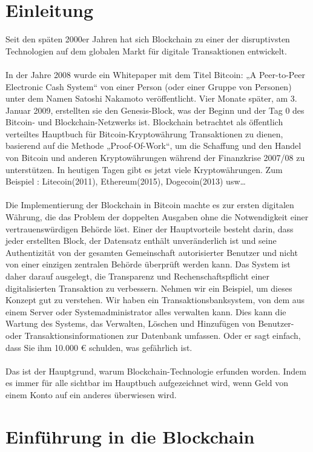 \documentclass[ngerman]{scrreprt}
\begin{document}
\chapter{Einleitung}
Seit den späten 2000er Jahren hat sich Blockchain zu einer der disruptivsten Technologien auf dem globalen Markt für digitale Transaktionen entwickelt.\\ \\
In der Jahre 2008 wurde ein Whitepaper mit dem Titel Bitcoin: „A Peer-to-Peer Electronic Cash System“ von einer Person (oder einer Gruppe von Personen) unter dem Namen Satoshi Nakamoto veröffentlicht. Vier Monate später, am 3. Januar 2009, erstellten sie den Genesis-Block, was der Beginn und der Tag 0 des Bitcoin- und Blockchain-Netzwerks ist. Blockchain betrachtet als öffentlich verteiltes Hauptbuch für Bitcoin-Kryptowährung Transaktionen zu dienen, basierend auf die Methode „Proof-Of-Work“, um die Schaffung und den Handel von Bitcoin und anderen Kryptowährungen während der Finanzkrise 2007/08 zu unterstützen. In heutigen Tagen gibt es jetzt viele Kryptowährungen. Zum Beispiel : Litecoin(2011), Ethereum(2015), Dogecoin(2013) usw… \\ \\
Die Implementierung der Blockchain in Bitcoin machte es zur ersten digitalen Währung, die das Problem der doppelten Ausgaben ohne die Notwendigkeit einer vertrauenswürdigen Behörde löst. Einer der Hauptvorteile besteht darin, dass jeder erstellten Block, der Datensatz enthält unveränderlich ist und seine Authentizität von der gesamten Gemeinschaft autorisierter Benutzer und nicht von einer einzigen zentralen Behörde überprüft werden kann. Das System ist daher darauf ausgelegt, die Transparenz und Rechenschaftspflicht einer digitalisierten Transaktion zu verbessern. Nehmen wir ein Beispiel, um dieses Konzept gut zu verstehen. Wir haben ein Transaktionsbanksystem, von dem aus einem Server oder Systemadministrator alles verwalten kann. Dies kann die Wartung des Systems, das Verwalten, Löschen und Hinzufügen von Benutzer- oder Transaktionsinformationen zur Datenbank umfassen. Oder er sagt einfach, dass Sie ihm 10.000 € schulden, was gefährlich ist. \\ \\
Das ist der Hauptgrund, warum Blockchain-Technologie erfunden worden. Indem es immer für alle sichtbar im Hauptbuch aufgezeichnet wird, wenn Geld von einem Konto auf ein anderes überwiesen wird.



\chapter{Einführung in die Blockchain}
\end{document}
